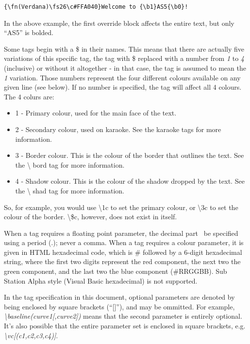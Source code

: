\documentclass{spec}
\begin{document}
\begin{verbatim}
{\fn(Verdana)\fs26\c#FFA040}Welcome to {\b1}AS5{\b0}!
\end{verbatim}

In the above example, the first override block affects the entire text, but only ``AS5'' is bolded.

Some tags begin with a \$ in their names. This means that there are actually five variations
of this specific tag, the tag with \$ replaced with a number from \emph{1} to \emph{4} (inclusive)
or without it altogether - in that case, the tag is assumed to mean the \emph{1} variation. Those
numbers represent the four different colours available on any given line (see below). If no number
is specified, the tag will affect all 4 colours. The 4 colurs are:

\begin{itemize}
\item 1 - Primary colour, used for the main face of the text.
\item 2 - Secondary colour, used on karaoke. See the karaoke tags for more information.
\item 3 - Border colour. This is the colour of the border that outlines the text. See the \textbackslash
bord tag for more information.
\item 4 - Shadow colour. This is the colour of the shadow dropped by the text. See the \textbackslash
shad tag for more information.
\end{itemize}

So, for example, you would use \textbackslash 1c to set the primary colour, or \textbackslash 3c to set
the colour of the border. \textbackslash \$c, however, does not exist in itself.

When a tag requires a floating point parameter, the decimal part \must\ be specified using a period (.);
never a comma. When a tag requires a colour parameter, it is given in HTML hexadecimal code, which is
\# followed by a 6-digit hexadecimal string, where the first two digits represent the red component,
the next two the green component, and the last two the blue component (\#RRGGBB). Sub Station Alpha
style (Visual Basic hexadecimal) is not supported.

In the tag specification in this document, optional parameters are denoted by being enclosed by square
brackets (``[]''), and may be ommitted. For example, \emph{\textbackslash baseline(curve1[,curve2])}
means that the second parameter is entirely optional. It's also possible that the entire parameter set
is enclosed in square brackets, e.g. \emph{\textbackslash vc[(c1,c2,c3,c4)]}.
\end{document}
